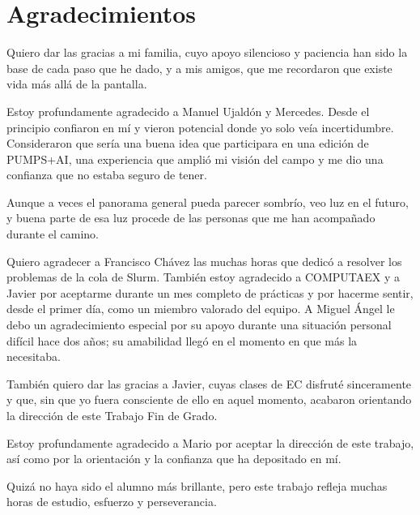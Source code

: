 \chapter*{Agradecimientos}

Quiero dar las gracias a mi familia, cuyo apoyo silencioso y paciencia han sido la base de cada paso que he dado, y a mis amigos, que me recordaron que existe vida más allá de la pantalla.

Estoy profundamente agradecido a Manuel Ujaldón y Mercedes. Desde el principio confiaron en mí y vieron potencial donde yo solo veía incertidumbre. Consideraron que sería una buena idea que participara en una edición de PUMPS+AI, una experiencia que amplió mi visión del campo y me dio una confianza que no estaba seguro de tener.

Aunque a veces el panorama general pueda parecer sombrío, veo luz en el futuro, y buena parte de esa luz procede de las personas que me han acompañado durante el camino.

Quiero agradecer a Francisco Chávez las muchas horas que dedicó a resolver los problemas de la cola de Slurm. También estoy agradecido a COMPUTAEX y a Javier por aceptarme durante un mes completo de prácticas y por hacerme sentir, desde el primer día, como un miembro valorado del equipo. A Miguel Ángel le debo un agradecimiento especial por su apoyo durante una situación personal difícil hace dos años; su amabilidad llegó en el momento en que más la necesitaba.

También quiero dar las gracias a Javier, cuyas clases de EC disfruté sinceramente y que, sin que yo fuera consciente de ello en aquel momento, acabaron orientando la dirección de este Trabajo Fin de Grado.

Estoy profundamente agradecido a Mario por aceptar la dirección de este trabajo, así como por la orientación y la confianza que ha depositado en mí.

Quizá no haya sido el alumno más brillante, pero este trabajo refleja muchas horas de estudio, esfuerzo y perseverancia.
